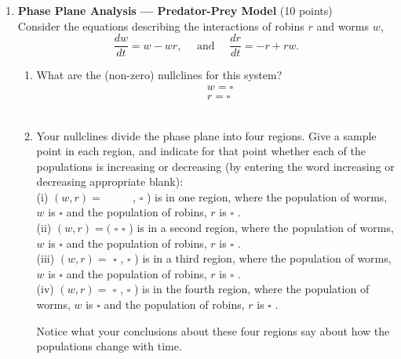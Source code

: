\begin{enumerate}
  \item \textbf{Phase Plane Analysis --- Predator-Prey Model} (10 points)\\
  Consider the equations describing the interactions of robins $r$ and worms $w$,
  $$
  \frac{d w}{d t}=w-w r, \quad \text { and } \quad \frac{d r}{d t}=-r+r w .
  $$
  \begin{enumerate}[label=(\alph*)]
    \item What are the (non-zero) nullclines for this system?\\
    $$
    \begin{aligned}
    & w=\square \\
    & r=\square
    \end{aligned}
    $$\\
    \begin{subanswer}
    \end{subanswer}
    \item Your nullclines divide the phase plane into four regions. Give a sample point in each region, and indicate for that point whether each of the populations is increasing or decreasing (by entering the word increasing or decreasing appropriate blank):\\
    (i) $(w, r)=$ $\qquad$ , $\square$ ) is in one region, where the population of worms, $w$ is $\square$ and the population of robins, $r$ is $\square$ .\\
    (ii) $(w, r)=($ $\square$ $\square$ ) is in a second region, where the population of worms, $w$ is $\square$ and the population of robins, $r$ is $\square$ .\\
    (iii) $(w, r)=$ $\square$ , $\square$ ) is in a third region, where the population of worms, $w$ is $\square$ and the population of robins, $r$ is $\square$ .\\
    (iv) $(w, r)=$ $\square$ , $\square$ ) is in the fourth region, where the population of worms, $w$ is $\square$ and the population of robins, $r$ is $\square$ .\\
    \begin{subanswer}
    \end{subanswer}
    Notice what your conclusions about these four regions say about how the populations change with time.
  \end{enumerate}


\end{enumerate}
